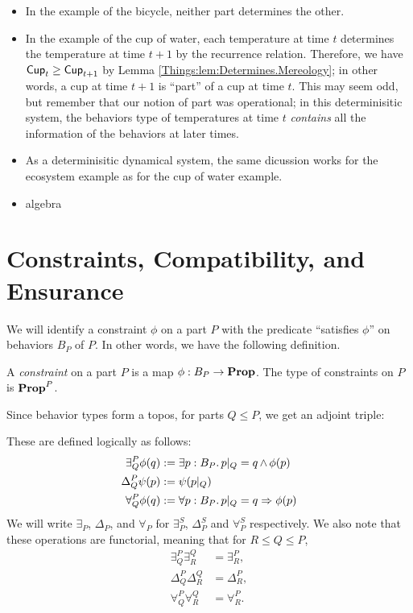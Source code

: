 \begin{ex}
\begin{itemize}
    \item In the example of the bicycle, neither part determines the other.
    \item In the example of the cup of water, each temperature at time $t$ determines the temperature at time $t + 1$ by the recurrence relation. Therefore, we have $\mathsf{{Cup}}_t \geq \mathsf{{Cup}}_{t + 1}$ by Lemma \ref{Things:lem:Determines.Mereology}; in other words, a cup at time $t + 1$ is ``part'' of a cup at time $t$. This may seem odd, but remember that our notion of part was operational; in this determinisitic system, the behaviors type of temperatures at time $t$ \emph{contains} all the information of the behaviors at later times.
    \item As a determinisitic dynamical system, the same dicussion works for the ecosystem example as for the cup of water example.
    \item algebra
\end{itemize}
\end{ex}


\section{Constraints, Compatibility, and Ensurance}

We will identify a constraint $\phi$ on a part $P$ with the predicate ``satisfies $\phi$'' on behaviors $B_P$ of $P$. In other words, we have the following definition.
\begin{defn}
A \emph{constraint} on a part $P$ is a map $\phi : B_P \to \operatorname{\textbf{Prop}}$. The type of constraints on $P$ is $\operatorname{\textbf{Prop}}^P$.
\end{defn}

Since behavior types form a topos, for parts $Q \leq P$, we get an adjoint triple:
    \begin{center}
    \end{center}\pause 
These are defined logically as follows:
\begin{align*}
    \exists^P_Q \phi(q) &:= \exists p : B_P.\, p|_Q = q \operatorname{\wedge} \phi(p) \\
    \Delta^P_Q \psi(p) &:= \psi(p|_Q) \\
    \forall^P_Q \phi(q) &:= \forall p : B_P.\, p|_Q = q \Rightarrow \phi(p)
\end{align*}
We will write $\exists_P$, $\Delta_P$, and $\forall_P$ for $\exists^S_P$, $\Delta^S_P$ and $\forall^S_P$ respectively. We also note that these operations are functorial, meaning that for $R \leq Q \leq P$,
\begin{align*}
    \exists^P_Q \exists^Q_R &= \exists^P_R, \\
    \Delta^P_Q \Delta^Q_R &= \Delta^P_R, \\
    \forall^P_Q \forall^Q_R &= \forall^P_R.
\end{align*}

